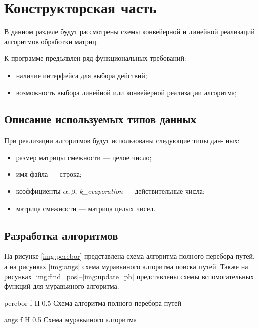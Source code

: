\chapter{Конструкторская часть}
В данном разделе будут рассмотрены схемы конвейерной и линейной реализаций алгоритмов обработки матриц.

К программе предъявлен ряд функциональных требований:

\begin{itemize}
    \item наличие интерфейса для выбора действий;
    \item возможность выбора линейной или конвейерной реализации алгоритма;
\end{itemize}

\section{Описание используемых типов данных}
При реализации алгоритмов будут использованы следующие типы дан-
ных:
\begin{itemize}[label=---]
	\item размер матрицы смежности --- целое число;
	\item имя файла --- строка;
	\item коэффициенты $\alpha, \beta$, \textit{k\_evaporation} --- действительные числа;
	\item матрица смежности --- матрица целых чисел.
\end{itemize}


\section{Разработка алгоритмов}

 
На рисунке \ref{img:perebor} представлена схема алгоритма полного перебора путей, а на рисунках \ref{img:angs} схема муравьиного алгоритма поиска путей. Также на рисунках \ref{img:find_pos}--\ref{img:update_ph} представлены схемы вспомогательных функций для муравьиного алгоритма.

{perebor} %
{f} %
{H} %
{0.5\textwidth} %
{Схема алгоритма полного перебора путей} %

{angs} %
{f} %
{H} %
{0.5\textwidth} %
{Схема муравьиного алгоритма} %

